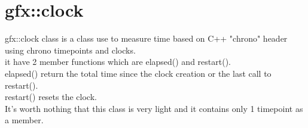 \section{gfx::clock}
  gfx::clock class is a class use to measure time based on 
  C++ "chrono" header using chrono timepoints and clocks. \\
  it have 2 member functions which are elapsed() and restart(). \\
  elapsed() return the total time since the clock creation or the
  last call to restart(). \\
  restart() resets the clock. \\
  It's worth nothing that this class is very light and it contains only 1 timepoint as a member.
